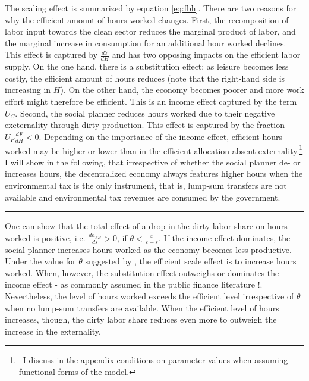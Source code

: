 The scaling effect is summarized by equation \ref{eq:fbh}.
There are two reasons for why the efficient amount of hours worked changes. 
First, the recomposition of labor input towards the  clean sector reduces the marginal product of labor, and the marginal increase in consumption for an additional hour worked declines.  This effect is captured by $\frac{dY}{dH}$ and has two opposing impacts on the efficient labor supply. On the one hand, there is a substitution effect: as leisure becomes less costly, the efficient amount of hours reduces (note that the right-hand side is increasing in $H$). On the other hand, the economy becomes poorer and more work effort might therefore be efficient. This is an income effect captured by the term $U_C$. 
Second, the social planner reduces hours worked due to their negative exeternality through dirty production. This effect is captured by the fraction $U_F\frac{dF}{dH}<0$. 
Depending on the importance of the income effect, efficient hours worked may be higher or lower than in the efficient allocation absent externality.\footnote{ \ I discuss in the appendix conditions on parameter values when assuming functional forms of the model.}
I will show in the following, that irrespective of whether the social planner de- or increases hours, the decentralized economy always features higher hours when the environmental tax is the only instrument, that is, lump-sum transfers are not available and environmental tax revenues are consumed by the government. 


\hrule
One can show that the total effect of a drop in the dirty labor share on hours worked is positive, i.e. $\frac{dh_{FB}}{ds}>0$, if $\theta<\frac{\varepsilon}{\varepsilon-s}$. If the income effect dominates, the social planner increases hours worked as the economy becomes less productive. 
Under the value for $\theta$ suggested by \cite{Boppart2019LaborPerspectiveb}, the efficient scale effect is to increase hours worked. When, however, the substitution effect outweighs or dominates the income effect - as commonly assumed in the public finance literature \citep{Heathcote2017OptimalFramework, LansBovenberg1994EnvironmentalTaxation, LansBovenberg1996OptimalAnalyses} !.
Nevertheless, the level of hours worked exceeds the efficient level irrespective of $\theta$ when no lump-sum transfers are available. 
When the efficient level of hours increases, though, the dirty labor share reduces even more to outweigh the increase in the externality.


